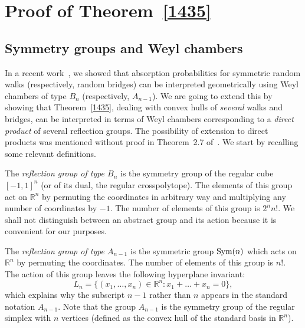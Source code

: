 \documentclass[12pt, reqno]{amsart}
\theoremstyle{plain}
\theoremstyle{definition}
\theoremstyle{remark}
\begin{document}
\section{Proof of Theorem~\ref{1435}}

\subsection{Symmetry groups and Weyl chambers}
In a recent work~\cite{KVZ15},  we showed that absorption probabilities for symmetric random walks (respectively, random bridges) can be interpreted geometrically using Weyl chambers of type $B_n$ (respectively, $A_{n-1}$).  We are going to extend this by  showing that Theorem~\ref{1435}, dealing with convex hulls of \emph{several} walks and bridges, can be interpreted in terms of Weyl chambers corresponding to a \emph{direct product} of several reflection groups. The possibility of extension to direct products was mentioned without proof in Theorem~2.7 of~\cite{KVZ15}.
We start by recalling some relevant definitions.

The \emph{reflection group of type $B_n$} is the symmetry group of the regular cube $[-1,1]^n$ (or of its dual, the regular crosspolytope). The elements of this group act on ${\mathbb{R}}^n$ by permuting the coordinates in arbitrary way and multiplying any number of coordinates by $-1$. The number of elements of this group is $2^n n!$. We shall not distinguish between an abstract group and its action because it is convenient for our purposes.

The \emph{reflection group of type $A_{n-1}$} is the symmetric group ${\text{\rm Sym}}(n)$ which acts on ${\mathbb{R}}^{n}$ by permuting the coordinates. The number of elements of this group is $n!$. The action of this group leaves the following hyperplane invariant:
$$
L_n= \{(x_1,\ldots,x_{n})\in {\mathbb{R}}^{n}\colon x_1+\ldots+x_{n} = 0\},
$$
which explains why the subscript $n-1$ rather than $n$ appears in the standard notation $A_{n-1}$.
Note that the group $A_{n-1}$ is the symmetry group of the regular simplex with $n$ vertices (defined as the convex hull of the standard basis in ${\mathbb{R}}^{n}$).
\end{document}
